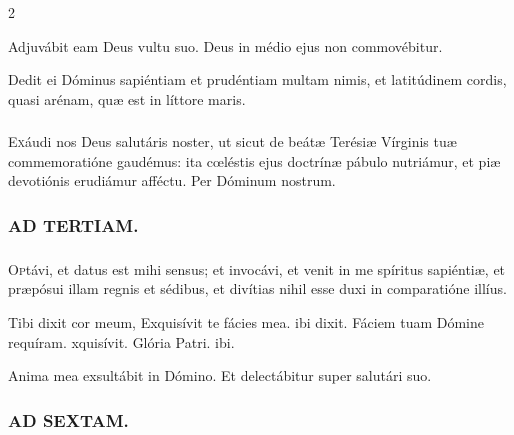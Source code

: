 \documentclass[9pt,twoside]{extarticle}
\begin{document}
\begin{multicols}{2}
\begin{tightlist}{}
\item {} Adjuvábit eam Deus vultu suo.  Deus in médio ejus non commovébitur.
\item {} Dedit ei Dóminus sapiéntiam et prudéntiam multam nimis, et latitúdinem cordis, quasi arénam, quæ est in líttore maris.
\end{tightlist}

\subsubsection*{\center {}}
\lettrine{E}xáudi nos Deus salutáris noster, ut sicut de beátæ Terésiæ Vírginis tuæ commemoratióne gaudémus: ita cœléstis ejus doctrínæ pábulo nutriámur, et piæ devotiónis erudiámur afféctu. Per Dóminum nostrum.

\begin{tightlist}{}
\item {}
\end{tightlist}

\subsubsection*{\center \textsc{AD TERTIAM.}}
\subsubsection*{\center {}}
\lettrine{O}ptávi, et datus est mihi sensus; et invocávi, et venit in me spíritus sapiéntiæ, et præpósui illam regnis et sédibus, et divítias nihil esse duxi in comparatióne illíus.

\begin{tightlist}{}
\item {} Tibi dixit cor meum, \textred{*} Exquisívit te fácies mea. ibi dixit.  Fáciem tuam Dómine requíram. xquisívit. Glória Patri. ibi.
\item {} Anima mea exsultábit in Dómino.  Et delectábitur super salutári suo.
\end{tightlist}

\subsubsection*{\center \textsc{AD SEXTAM.}}

\end{multicols}
\end{document}
